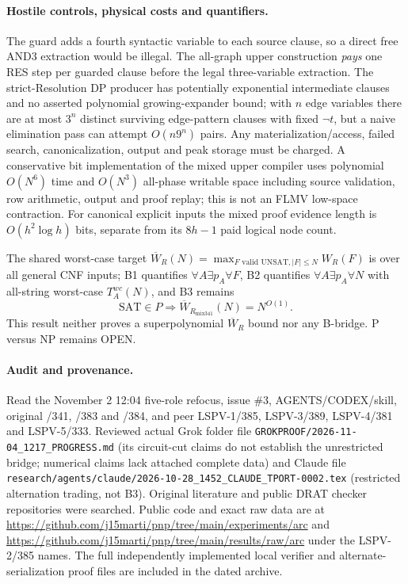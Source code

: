 \documentclass[11pt]{article}
\begin{document}
\paragraph{Hostile controls, physical costs and quantifiers.}
The guard adds a fourth syntactic variable to each source clause, so a direct free AND3 extraction would be illegal. The all-graph upper construction \emph{pays} one RES step per guarded clause before the legal three-variable extraction. The strict-Resolution DP producer has potentially exponential intermediate clauses and no asserted polynomial growing-expander bound; with $n$ edge variables there are at most $3^n$ distinct surviving edge-pattern clauses with fixed $\neg t$, but a naive elimination pass can attempt $O(n9^n)$ pairs. Any materialization/access, failed search, canonicalization, output and peak storage must be charged. A conservative bit implementation of the mixed upper compiler uses polynomial $O(N^6)$ time and $O(N^3)$ all-phase writable space including source validation, row arithmetic, output and proof replay; this is not an FLMV low-space contraction. For canonical explicit inputs the mixed proof evidence length is $O(h^2\log h)$ bits, separate from its $8h-1$ paid logical node count.

The shared worst-case target $\overline W_R(N)=\max_{F\text{ valid UNSAT},|F|\le N}W_R(F)$ is over all general CNF inputs; B1 quantifies $\forall A\exists p_A\forall F$, B2 quantifies $\forall A\exists p_A\forall N$ with all-string worst-case $T_A^{wc}(N)$, and B3 remains
\[
\mathrm{SAT}\in P\Longrightarrow \overline W_{R_{\mathrm{mix341}}}(N)=N^{O(1)}.
\]
This result neither proves a superpolynomial $\overline W_R$ bound nor any B-bridge. P versus NP remains OPEN.

\paragraph{Audit and provenance.}
Read the November 2 12:04 five-role refocus, issue \#3, AGENTS/CODEX/skill, original /341, /383 and /384, and peer LSPV-1/385, LSPV-3/389, LSPV-4/381 and LSPV-5/333. Reviewed actual Grok folder file \texttt{GROKPROOF/2026-11-04\_1217\_PROGRESS.md} (its circuit-cut claims do not establish the unrestricted bridge; numerical claims lack attached complete data) and Claude file \texttt{research/agents/claude/2026-10-28\_1452\_CLAUDE\_TPORT-0002.tex} (restricted alternation trading, not B3). Original literature and public DRAT checker repositories were searched. Public code and exact raw data are at \url{https://github.com/j15marti/pnp/tree/main/experiments/arc} and \url{https://github.com/j15marti/pnp/tree/main/results/raw/arc} under the LSPV-2/385 names. The full independently implemented local verifier and alternate-serialization proof files are included in the dated archive.
\end{document}
